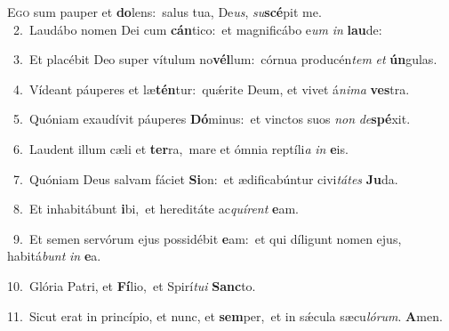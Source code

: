 \lettrine{\initial\textcolor{\initialcolor}{E}}{go} sum pauper et \textbf{do}\-lens:~\star salus tua, De\-\textit{us}\-, \textit{su}\-\textbf{scé}pit me.\\
{\numbfont\textcolor{\numbcolor}{~2.}}~Laudábo nomen Dei cum \textbf{cán}\-tico:~\star et magnificábo e\textit{um} \textit{in} \textbf{lau}\-de:\par
{\numbfont\textcolor{\numbcolor}{~3.}}~Et placébit Deo super vítulum no\-\textbf{vél}\-lum:~\star córnua producén\textit{tem} \textit{et} \textbf{ún}\-gulas.\par
{\numbfont\textcolor{\numbcolor}{~4.}}~Vídeant páuperes et læ\-\textbf{tén}\-tur:~\star quǽrite Deum, et vivet á\-\textit{ni}\-\textit{ma} \textbf{ves}\-tra.\par
{\numbfont\textcolor{\numbcolor}{~5.}}~Quóniam exaudívit páuperes \textbf{Dó}\-minus:~\star et vinctos suos \textit{non} \textit{de}\-\textbf{spé}xit.\par
{\numbfont\textcolor{\numbcolor}{~6.}}~Laudent illum cæli et \textbf{ter}\-ra,~\star mare et ómnia reptíli\textit{a} \textit{in} \textbf{e}\-is.\par
{\numbfont\textcolor{\numbcolor}{~7.}}~Quóniam Deus salvam fáciet \textbf{Si}\-on:~\star et ædificabúntur civi\-\textit{tá}\-\textit{tes} \textbf{Ju}\-da.\par
{\numbfont\textcolor{\numbcolor}{~8.}}~Et inhabitábunt \textbf{i}\-bi,~\star et hereditáte ac\-\textit{quí}\-\textit{rent} \textbf{e}\-am.\par
{\numbfont\textcolor{\numbcolor}{~9.}}~Et semen servórum ejus possidébit \textbf{e}\-am:~\star et qui díligunt nomen ejus, habitá\textit{bunt} \textit{in} \textbf{e}\-a.\par
{\numbfont\textcolor{\numbcolor}{10.}}~Glória Patri, et \textbf{Fí}\-lio,~\star et Spirí\-\textit{tu}\-\textit{i} \textbf{Sanc}\-to.\par
{\numbfont\textcolor{\numbcolor}{11.}}~Sicut erat in princípio, et nunc, et \textbf{sem}\-per,~\star et in sǽcula sæcu\-\textit{ló}\-\textit{rum}. \textbf{A}\-men.\par
